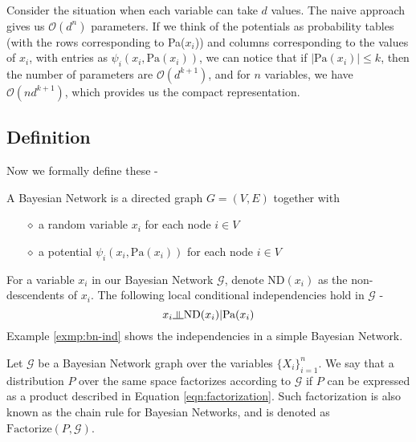 Consider the situation when each variable can take $d$ values. The naive approach gives us $\mathcal{O}(d^n)$ parameters. If we think of the potentials as probability tables (with the rows corresponding to Pa($x_i$)) and columns corresponding to the values of $x_i$, with entries as $\psi_{i}(x_i, \text{Pa}(x_i))$, we can notice that if $|\text{Pa}(x_i)| \leq k$, then the number of parameters are $\mathcal{O}(d^{k+1})$, and for $n$ variables, we have $\mathcal{O}(nd^{k+1})$, which provides us the compact representation.
\subsection{Definition}
Now we formally define these -
\begin{defn}
A Bayesian Network is a directed graph $G = (V, E)$ together with 
\begin{itemize}
	\item[$\diamond$] a random variable $x_i$ for each node $i \in V$
	\item[$\diamond$] a potential $\psi_i(x_i, \text{Pa}(x_i))$ for each node $i \in V$
\end{itemize}
\end{defn}
For a variable $x_i$ in our Bayesian Network $\mathcal G$, denote $\text{ND}(x_i)$ as the non-descendents of $x_i$. The following local conditional independencies hold in $\mathcal G$ - 
\begin{equation}
	x_i \ind \text{ND}(x_i) | \text{Pa}(x_i)
\end{equation}
Example \ref{exmp:bn-ind} shows the independencies in a simple Bayesian Network.
\begin{defn}[Factorization]	
Let $\mathcal{G}$ be a Bayesian Network graph over the variables $\{X_i\}_{i=1}^n$. We say that a distribution $P$ over the same space factorizes according to $\mathcal G$ if $P$ can be expressed as a product described in Equation \ref{eqn:factorization}. Such factorization is also known as the chain rule for Bayesian Networks, and is denoted as $\text{Factorize}(P, \mathcal G)$.
\end{defn}

